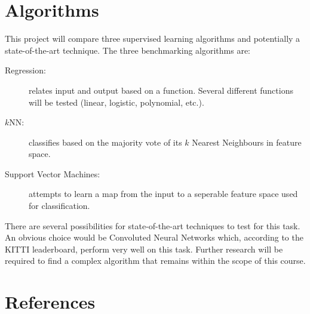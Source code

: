 \documentclass[a4paper,10pt]{article}
\begin{document}
\section{Algorithms}
This project will compare three supervised learning algorithms and potentially a state-of-the-art technique. The three benchmarking algorithms are:
\begin{description}
 \item[Regression:] relates input and output based on a function. Several different functions will be tested (linear, logistic, polynomial, etc.).
 \item[$k$NN:] classifies based on the majority vote of its $k$ Nearest Neighbours in feature space.
 \item[Support Vector Machines:] attempts to learn a map from the input to a seperable feature space used for classification.
\end{description}

There are several possibilities for state-of-the-art techniques to test for this task. An obvious choice would be Convoluted Neural Networks which, according to the KITTI leaderboard, perform very well on this task\cite{}. Further research will be required to find a complex algorithm that remains within the scope of this course.

\section{References}
\end{document}
